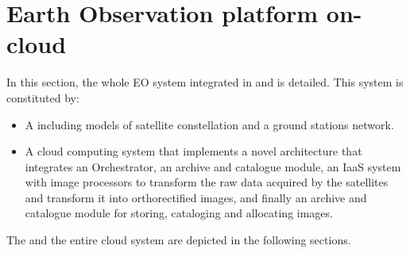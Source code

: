\section{Earth Observation platform on-cloud}

In this section, the whole \ac{EO} system integrated in \vw and \bonfire is
detailed. This system is constituted by:
\begin{itemize}
\item A \sss including models of satellite constellation and a ground stations
  network.
\item A cloud computing system that implements a novel architecture that
  integrates an Orchestrator, an archive and catalogue module, an IaaS system
  with image processors to transform the raw data acquired by the satellites and
  transform it into orthorectified images, and finally an archive and catalogue
  module for storing, cataloging and allocating images.
\end{itemize}

The \sss and the entire cloud system are depicted in the following sections.



